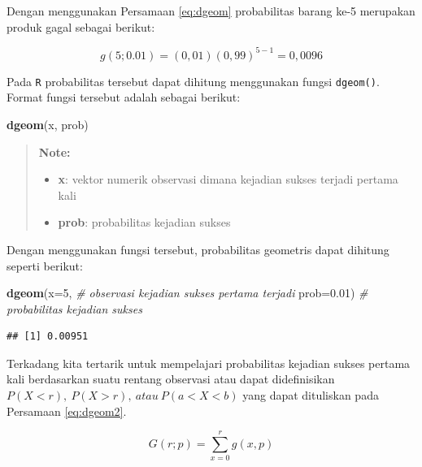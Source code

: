 \documentclass[]{book}
\newenvironment{Shaded}{\begin{snugshade}}{\end{snugshade}}
\newcommand{\KeywordTok}[1]{\textcolor[rgb]{0.13,0.29,0.53}{\textbf{#1}}}
\newcommand{\DataTypeTok}[1]{\textcolor[rgb]{0.13,0.29,0.53}{#1}}
\newcommand{\DecValTok}[1]{\textcolor[rgb]{0.00,0.00,0.81}{#1}}
\newcommand{\FloatTok}[1]{\textcolor[rgb]{0.00,0.00,0.81}{#1}}
\newcommand{\CommentTok}[1]{\textcolor[rgb]{0.56,0.35,0.01}{\textit{#1}}}
\newcommand{\NormalTok}[1]{#1}
\providecommand{\tightlist}{%
  \setlength{\itemsep}{0pt}\setlength{\parskip}{0pt}}
\begin{document}
Dengan menggunakan Persamaan \eqref{eq:dgeom} probabilitas barang ke-5
merupakan produk gagal sebagai berikut:

\[
g\left(5;0.01\right)=\left(0,01\right)\left(0,99\right)^{5-1}=0,0096
\]

Pada \texttt{R} probabilitas tersebut dapat dihitung menggunakan fungsi
\texttt{dgeom()}. Format fungsi tersebut adalah sebagai berikut:

\begin{Shaded}
\begin{Highlighting}[]
\KeywordTok{dgeom}\NormalTok{(x, prob)}
\end{Highlighting}
\end{Shaded}

\begin{quote}
\textbf{Note: }

\begin{itemize}
\tightlist
\item
  \textbf{x}: vektor numerik observasi dimana kejadian sukses terjadi
  pertama kali
\item
  \textbf{prob}: probabilitas kejadian sukses
\end{itemize}
\end{quote}

Dengan menggunakan fungsi tersebut, probabilitas geometris dapat
dihitung seperti berikut:

\begin{Shaded}
\begin{Highlighting}[]
\KeywordTok{dgeom}\NormalTok{(}\DataTypeTok{x=}\DecValTok{5}\NormalTok{, }\CommentTok{# observasi kejadian sukses pertama terjadi}
      \DataTypeTok{prob=}\FloatTok{0.01}\NormalTok{) }\CommentTok{# probabilitas kejadian sukses}
\end{Highlighting}
\end{Shaded}

\begin{verbatim}
## [1] 0.00951
\end{verbatim}

Terkadang kita tertarik untuk mempelajari probabilitas kejadian sukses
pertama kali berdasarkan suatu rentang observasi atau dapat
didefinisikan
\(P\left(X<r\right),\ P\left(X>r\right),\ atau\ P\left(a<X<b\right)\)
yang dapat dituliskan pada Persamaan \eqref{eq:dgeom2}.

\begin{equation}
   G\left(r;p\right)=\sum _{x=0}^rg\left(x,p\right)
  \label{eq:dgeom2}
\end{equation}
\end{document}

